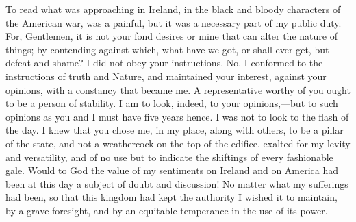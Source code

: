 To read what was approaching in Ireland, in the black and bloody characters of the American war, was a painful, but it was a necessary part of my public duty. For, Gentlemen, it is not your fond desires or mine that can alter the nature of things; by contending against which, what have we got, or shall ever get, but defeat and shame? I did not obey your instructions. No. I conformed to the instructions of truth and Nature, and maintained your interest, against your opinions, with a constancy that became me. A representative worthy of you ought to be a person of stability. I am to look, indeed, to your opinions,—but to such opinions as you and I must have five years hence. I was not to look to the flash of the day. I knew that you chose me, in my place, along with others, to be a pillar of the state, and not a weathercock on the top of the edifice, exalted for my levity and versatility, and of no use but to indicate the shiftings of every fashionable gale. Would to God the value of my sentiments on Ireland and on America had been at this day a subject of doubt and discussion! No matter what my sufferings had been, so that this kingdom had kept the authority I wished it to maintain, by a grave foresight, and by an equitable temperance in the use of its power.

